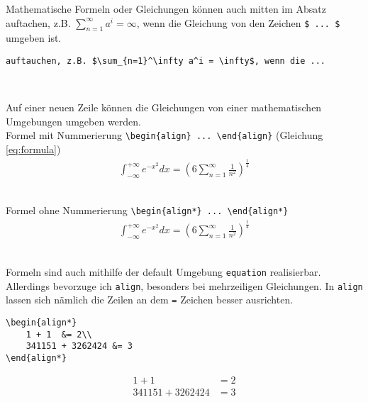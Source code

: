 Mathematische Formeln oder Gleichungen können auch 
mitten im Absatz auftachen, z.B. $\sum_{n=1}^\infty a^i = \infty$,
wenn die Gleichung von den Zeichen \verb|$ ... $|
umgeben ist.

\begin{verbatim}
auftauchen, z.B. $\sum_{n=1}^\infty a^i = \infty$, wenn die ...
\end{verbatim}~ 

Auf einer neuen Zeile können die Gleichungen
von einer mathematischen Umgebungen umgeben werden.\\

Formel mit Nummerierung \verb|\begin{align} ... \end{align}| (Gleichung \ref{eq:formula})
\begin{align}
\int_{-\infty}^{+\infty} e^{-x^2} dx = \left( 6 \sum_{n=1}^{\infty} \frac{1}{n^2} \right)^\frac{1}{4}
\label{eq:formula}
\end{align}~

Formel ohne Nummerierung \verb|\begin{align*} ... \end{align*}|
\begin{align*}
\int_{-\infty}^{+\infty} e^{-x^2} dx = \left( 6 \sum_{n=1}^{\infty} \frac{1}{n^2} \right)^\frac{1}{4}
\end{align*}~

Formeln sind auch mithilfe der default Umgebung \verb|equation| realisierbar.
Allerdings bevorzuge ich \texttt{align}, besonders bei
mehrzeiligen Gleichungen. In \texttt{align} lassen sich nämlich
die Zeilen an dem \texttt{=} Zeichen besser ausrichten.
\begin{verbatim}
\begin{align*}
    1 + 1  &= 2\\
    341151 + 3262424 &= 3
\end{align*}
\end{verbatim}
\begin{align*}
1 + 1 &= 2\\
341151 + 3262424 &= 3
\end{align*}